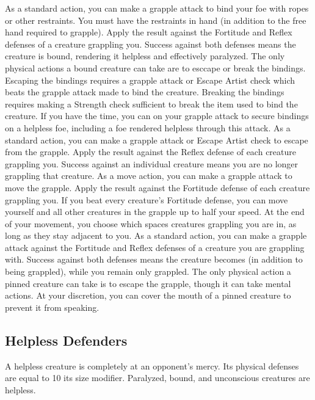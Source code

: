              As a standard action, you can make a grapple attack to bind your foe with ropes or other restraints. You must have the restraints in hand (in addition to the free hand required to grapple). Apply the result against the Fortitude and Reflex defenses of a creature grappling you. Success against both defenses means the creature is bound, rendering it helpless and effectively paralyzed. The only physical actions a bound creature can take are to esccape or break the bindings. Escaping the bindings requires a grapple attack or Escape Artist check which beats the grapple attack made to bind the creature. Breaking the bindings requires making a Strength check sufficient to break the item used to bind the creature. If you have the time, you can  on your grapple attack to secure bindings on a helpless foe, including a foe rendered helpless through this attack.
             As a standard action, you can make a grapple attack or Escape Artist check to escape from the grapple. Apply the result against the Reflex defense of each creature grappling you. Success against an individual creature means you are no longer grappling that creature.
             As a move action, you can make a grapple attack to move the grapple. Apply the result against the Fortitude defense of each creature grappling you. If you beat every creature's Fortitude defense, you can move yourself and all other creatures in the grapple up to half your speed. At the end of your movement, you choose which spaces creatures grappling you are in, as long as they stay adjacent to you.
             As a standard action, you can make a grapple attack against the Fortitude and Reflex defenses of a creature you are grappling with. Success against both defenses means the creature becomes  (in addition to being grappled), while you remain only grappled. The only physical action a pinned creature can take is to escape the grapple, though it can take mental actions. At your discretion, you can cover the mouth of a pinned creature to prevent it from speaking.

    \subsection{Helpless Defenders}
        A helpless creature is completely at an opponent's mercy. Its physical defenses are equal to 10 \add its size modifier. Paralyzed, bound, and unconscious creatures are helpless.

